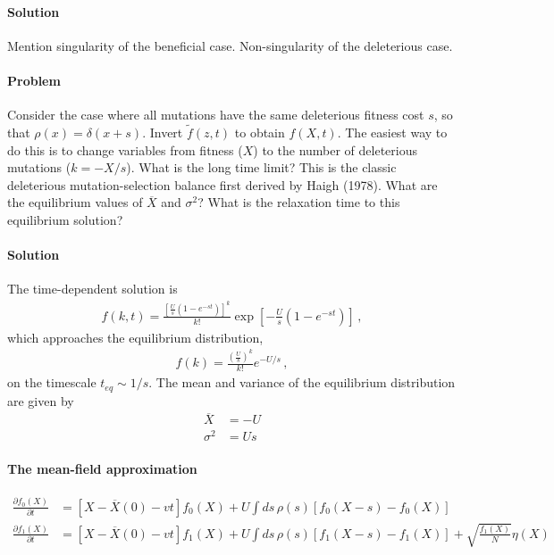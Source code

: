 \documentclass[11pt]{article}
\begin{document}
\paragraph{Solution}

Mention singularity of the beneficial case. Non-singularity of the deleterious case. 

\paragraph{Problem} Consider the case where all mutations have the same deleterious fitness cost $s$, so that $\rho(x) = \delta(x+s)$. Invert $\tilde{f}(z,t)$ to obtain $f(X,t)$. The easiest way to do this is to change variables from fitness ($X$) to the number of deleterious mutations ($k = -X/s$). What is the long time limit? This is the classic deleterious mutation-selection balance first derived by Haigh (1978). What are the equilibrium values of $\overline{X}$ and $\sigma^2$? What is the relaxation time to this equilibrium solution? 

\paragraph{Solution} 
The time-dependent solution is
\begin{align}
f(k,t) = \frac{\left[ \frac{U}{s} \left( 1 - e^{-st} \right) \right]^k}{k!} \exp \left[ - \frac{U}{s} \left( 1 - e^{-st} \right) \right] \, ,
\end{align}
which approaches the equilibrium distribution,
\begin{align}
f(k) = \frac{\left(\frac{U}{s}\right)^k}{k!} e^{-U/s} \, ,
\end{align}
on the timescale $t_{eq} \sim 1/s$. The mean and variance of the equilibrium distribution are given by
\begin{align}
\overline{X} & = - U \\
\sigma^2 & = U s 
\end{align}

\paragraph{The mean-field approximation} 

\begin{align}
\frac{\partial f_0(X)}{\partial t} & = \left[ X-\overline{X}(0)-vt \right] f_0(X) + U \int ds \, \rho(s) \left[ f_0(X-s) - f_0(X) \right] \\
\frac{\partial f_1(X)}{\partial t} & = \left[ X - \overline{X}(0) - vt \right] f_1(X) + U \int ds \, \rho(s) \left[ f_1(X-s) - f_1(X) \right] + \sqrt{\frac{f_1(X)}{N}} \eta(X)  
\end{align}
\end{document}

